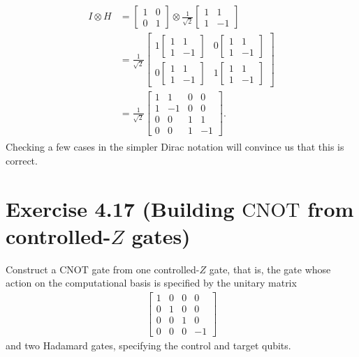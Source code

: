 \documentclass{book}
\begin{document}
    \begin{align}
    \begin{aligned}
        I \otimes H &= \begin{bmatrix}
            1 & 0 \\
            0 & 1
        \end{bmatrix} \otimes \frac{1}{\sqrt{2}}\begin{bmatrix}
            1 & 1 \\
            1 & -1
        \end{bmatrix} \\
        &= \frac{1}{\sqrt{2}} \begin{bmatrix}
            1 \begin{bmatrix}
                1 & 1 \\
                1 & -1
            \end{bmatrix} & 0 \begin{bmatrix}
                1 & 1 \\ 
                1 & -1
            \end{bmatrix} \\[4ex]
            0 \begin{bmatrix}
                1 & 1 \\
                1 & -1
            \end{bmatrix} & 1 \begin{bmatrix}
                1 & 1 \\
                1 & -1
            \end{bmatrix}
        \end{bmatrix} \\
        &= \frac{1}{\sqrt{2}} \begin{bmatrix}
            1 & 1 & 0 & 0 \\
            1 & -1 & 0 & 0 \\
            0 & 0 & 1 & 1 \\
            0 & 0 & 1 & -1
        \end{bmatrix}.
    \end{aligned}
    \end{align}
    Checking a few cases in the simpler Dirac notation will convince us that this is correct. 

\section*{Exercise 4.17 (Building $\mathrm{CNOT}$ from controlled-$Z$ gates)}
    Construct a $\mathrm{CNOT}$ gate from one controlled-$Z$ gate, that is, the gate whose action on the computational basis is specified by the unitary matrix
    \begin{align}
        \begin{bmatrix}
            1 & 0 & 0 & 0 \\
            0 & 1 & 0 & 0 \\
            0 & 0 & 1 & 0 \\
            0 & 0 & 0 & -1
        \end{bmatrix}
    \end{align}
    and two Hadamard gates, specifying the control and target qubits.
\end{document}
